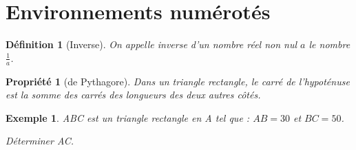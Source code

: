 \documentclass[a4paper,12pt]{report}
\newtheorem{definition}{Définition}[section]
\newtheorem{propriete}{Propriété}
\newtheorem{exemple}{Exemple}[definition]
\begin{document}
\section{Environnements numérotés}

\begin{definition}[Inverse]
On appelle inverse d'un nombre réel non nul $a$ le nombre $\frac{1}{a}$.
\end{definition}

\begin{propriete}[de Pythagore]
Dans un triangle rectangle, le carré de l'hypoténuse est la somme des
carrés des longueurs des deux autres côtés.
\end{propriete}

\begin{exemple}
ABC est un triangle rectangle en A tel que : $AB=30$ et $BC=50$.

Déterminer AC.
\end{exemple}
\end{document}
